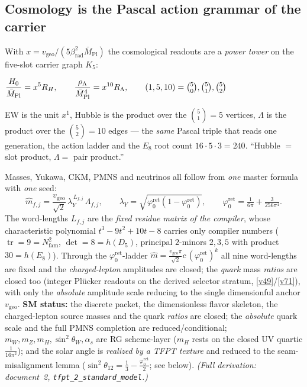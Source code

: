 \documentclass[11pt,a4paper]{article}
\newcommand{\Nfam}{N_{\mathrm{fam}}}
\newcommand{\phiz}{\varphi_0^{\mathrm{ret}}}
\newcommand{\Mbar}{\bar M_{\mathrm{Pl}}}
\begin{document}
\subsection*{Cosmology is the Pascal action grammar of the carrier}
\noindent With $x=v_{\mathrm{geo}}/(5\beta_{\mathrm{rad}}^2\Mbar)$ the cosmological readouts are a \emph{power tower}
on the five-slot carrier graph $K_5$:
\begin{keyeq}
$\displaystyle \frac{H_0}{\Mbar}=x^{5}R_H,\qquad \frac{\rho_\Lambda}{\Mbar^4}=x^{10}R_\Lambda,\qquad
  (1,5,10)=\tbinom50,\tbinom51,\tbinom52$
\end{keyeq}
EW is the unit $x^1$, Hubble is the product over the $\binom51=5$ vertices, $\Lambda$ is the product over
the $\binom52=10$ edges --- the \emph{same} Pascal triple that reads one generation, the action ladder
and the $E_8$ root count $16\cdot5\cdot3=240$. ``Hubble $=$ slot product, $\Lambda=$ pair product.'' \mE

\TFPTactionkfive

\begin{winboxnb}
Masses, Yukawa, CKM, PMNS and neutrinos all follow from \emph{one} master formula with \emph{one} seed:
\[
  \hat m_{f,j}=\frac{v_{\mathrm{geo}}}{\sqrt2}\,\lambda_Y^{\,L_{f,j}}\,\Lambda_{f,j},\qquad
  \lambda_Y=\sqrt{\phiz(1-\phiz)},\qquad \phiz=\tfrac1{6\pi}+\tfrac3{256\pi^4}.
\]
The word-lengths $L_{f,j}$ are the \emph{fixed residue matrix of the compiler}, whose characteristic
polynomial $t^3-9t^2+10t-8$ carries only compiler numbers ($\operatorname{tr}=9=\Nfam^2$,
$\det=8=h(D_5)$, principal $2$-minors $2{,}3{,}5$ with product $30=h(E_8)$). Through the $\phiz$-ladder
$\hat m=\tfrac{v_{\mathrm{geo}}\pi}{\sqrt2}c\,(\phiz)^k$ all nine word-lengths are fixed and the
\emph{charged-lepton} amplitudes are closed; the \emph{quark} mass \emph{ratios} are closed too (integer
Pl\"ucker readouts on the derived selector stratum, \vref{v49}/\vref{v71}), with only the \emph{absolute} amplitude scale
reducing to the single dimensionful anchor $v_{\mathrm{geo}}$.
\textbf{SM status:} the discrete packet, the dimensionless flavor skeleton, the charged-lepton source
masses and the quark \emph{ratios} are closed; the \emph{absolute} quark scale and the full PMNS completion
are reduced/conditional;
$m_W,m_Z,m_H,\sin^2\theta_W,\alpha_s$ are RG scheme-layer ($m_H$ rests on the closed UV quartic
$\tfrac1{16\pi^2}$); and the solar angle is \emph{realized by a TFPT texture} and reduced to the
seam-misalignment lemma ($\sin^2\theta_{12}=\tfrac13-\tfrac{\phiz}{2}$; see below). \emph{(Full derivation:
document~2, \texttt{tfpt\_2\_standard\_model}.)}
  
\end{winboxnb}
\end{document}
